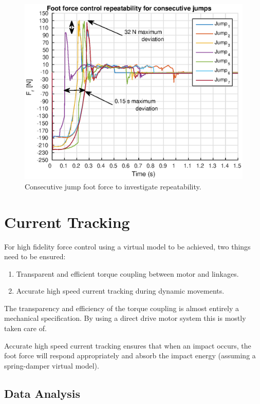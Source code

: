 \begin{figure}
\centering
\includegraphics[width=1\textwidth]{images/experiments/multi-jump-plot.eps} 
\caption{Consecutive jump foot force to investigate repeatability.}
\label{fig:multi-jump-plot}
\end{figure}

\section{Current Tracking}

For high fidelity force control using a virtual model to be achieved, two things need to be ensured:
\begin{enumerate}
\item Transparent and efficient torque coupling between motor and linkages.
\item Accurate high speed current tracking during dynamic movements. 
\end{enumerate}

The transparency and efficiency of the torque coupling is almost entirely a mechanical specification. By using a direct drive motor system this is mostly taken care of.

Accurate high speed current tracking ensures that when an impact occurs, the foot force will respond appropriately and absorb the impact energy (assuming a spring-damper virtual model). 

\subsection{Data Analysis}

